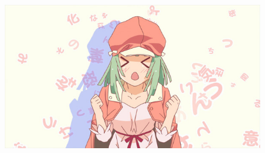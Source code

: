 \documentclass[A4 paper, 12pt, oneside, landscape]{article}
\begin{document}
\begin{multicols}{2}
	\end{multicols}

    \begin{figure}
        \centering
        \includegraphics{renai.png}
    \end{figure}
\end{document}
